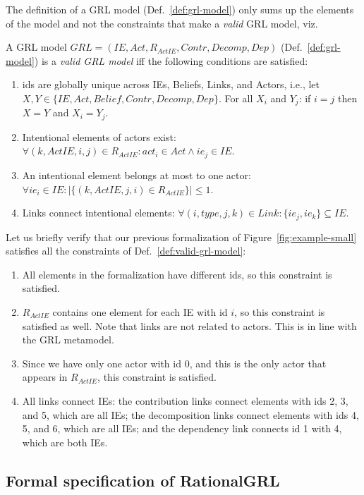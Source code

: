 The definition of a GRL model (Def.~\ref{def:grl-model}) only sums up the elements of the model and not the constraints that make a \emph{valid} GRL model, viz. 

\begin{definition}
\label{def:valid-grl-model}
A GRL model $GRL=(IE, Act, R_{ActIE}, Contr, Decomp, Dep)$ (Def.~\ref{def:grl-model}) is a \emph{valid GRL model} iff the following conditions are satisfied:
\begin{enumerate}
\item ids are globally unique across IEs, Beliefs, Links, and Actors, i.e., let $X,Y\in \{IE,Act, Belief, Contr, Decomp, Dep\}$. For all $X_i$ and $Y_j$: if $i=j$ then $X=Y$ and $X_i=Y_j$.
\item Intentional elements of actors exist: $\forall (k, ActIE, i,j)\in R_{ActIE}: act_i \in Act \wedge ie_j \in IE$.
\item An intentional element belongs at most to one actor: $\forall ie_i\in IE: |\{(k,ActIE,j,i)\in R_{ActIE}\}| \le 1$.
\item Links connect intentional elements: $\forall (i,type, j,k)\in Link: \{ie_j,ie_k\}\subseteq IE$.
\end{enumerate}
\end{definition}

Let us briefly verify that our previous formalization of Figure~\ref{fig:example-small} satisfies all the constraints of Def.~\ref{def:valid-grl-model}:
\begin{enumerate}
\item All elements in the formalization have different ids, so this constraint is satisfied.
\item $R_{ActIE}$ contains one element for each IE with id $i$, so this constraint is satisfied as well. Note that links are not related to actors. This is in line with the GRL metamodel.
\item Since we have only one actor with id 0, and this is the only actor that appears in $R_{ActIE}$, this constraint is satisfied.
\item All links connect IEs: the contribution links connect elements with ids 2, 3, and 5, which are all IEs; the decomposition links connect elements with ids 4, 5, and 6, which are all IEs; and the dependency link connects id 1 with 4, which are both IEs.
\end{enumerate}

\subsection{Formal specification of RationalGRL}
\label{sect:formalframework:rationalgrl}

